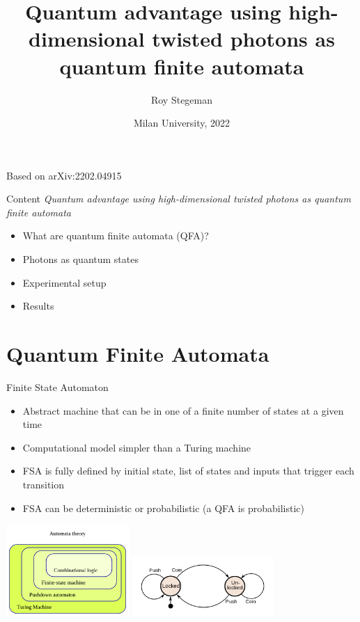 \documentclass[aspectratio=169,9pt]{beamer}
\title{Quantum advantage using high-dimensional twisted photons as quantum finite automata}
\date{Milan University, 2022}
\author{Roy Stegeman}
\institute{University of Milan and INFN Milan}
\begin{document}
{
\begin{frame}
  \titlepage


  Based on arXiv:2202.04915

\end{frame}
}



\begin{frame}[t]{Content}
  \textit{Quantum advantage using high-dimensional twisted photons as quantum finite automata}
  \vspace*{1em}
  \begin{itemize}
    \item What are quantum finite automata (QFA)?
    \item Photons as quantum states
    \item Experimental setup
    \item Results
  \end{itemize}
\end{frame}


\section{Quantum Finite Automata}
\begin{frame}[t]{Finite State Automaton}
  \begin{itemize}
    \item Abstract machine that can be in one of a finite number of states at a given time
    \item Computational model simpler than a Turing machine
    \item FSA is fully defined by initial state, list of states and inputs that trigger each transition
    \item FSA can be deterministic or probabilistic (a QFA is probabilistic)
  \end{itemize}
  \includegraphics[width=0.35\textwidth]{Automata_hierarchy.png}
  \includegraphics[width=0.4\textwidth]{turnstile.png}
\end{frame}
\end{document}
